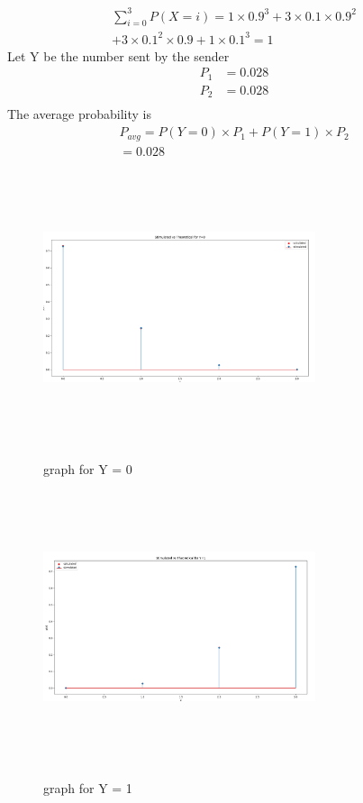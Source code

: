 \documentclass[11pt,a4,twocolumn]{article}
\begin{document}
\begin{flushleft}
\begin{multline*}
\sum_{i=0}^3P(X = i) = 1\times 0.9^3 + 3\times 0.1\times 0.9^2 \\
+ 3\times 0.1^2 \times 0.9 + 1\times 0.1^3 = 1
\end{multline*}
Let Y be the number sent by the sender
\begin{align*}
P_1 &= 0.028\\
P_2 &= 0.028\\
\end{align*}
The average probability is 
\begin{multline}
P_{avg} = P(Y = 0)\times P_1 +P(Y = 1)\times P_2\\ = 0.028 
\end{multline}
\begin{table}[H]
\caption{Probability of number of 1's recieved  }
\label{table:1}
\end{table}
\end{flushleft}
\begin{figure}[H]
\includegraphics[width=8cm, height=8cm]{assignment2_plot1}
\label{fig:1}
\caption{graph for Y = 0}
\end{figure}
\begin{figure}[H]
\includegraphics[width=8cm, height=8cm]{assignment2_plot2}
\label{fig:1}
\caption{graph for Y = 1}
\end{figure}
\end{document}
